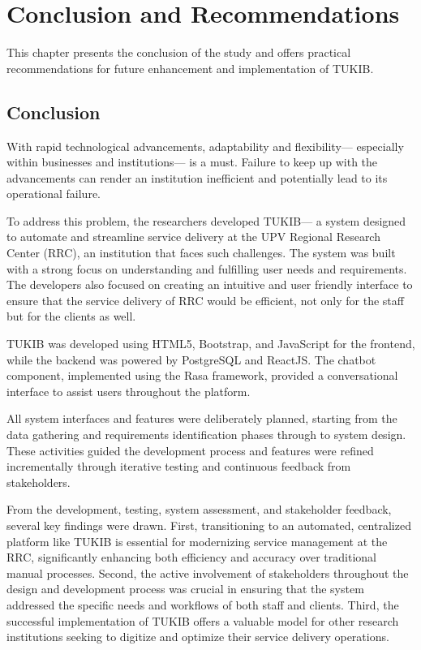 \chapter{Conclusion and Recommendations}
This chapter presents the conclusion of the study and offers practical recommendations for future enhancement and implementation of TUKIB.

\section{Conclusion}

With rapid technological advancements, adaptability and flexibility— especially within businesses and institutions— is a must. Failure to keep up with the advancements can render an institution inefficient and potentially lead to its operational failure.

To address this problem, the researchers developed TUKIB— a system designed to automate and streamline service delivery at the UPV Regional Research Center (RRC), an institution that faces such challenges. The system was built with a strong focus on understanding and fulfilling user needs and requirements. The developers also focused on creating an intuitive and user friendly interface to ensure that the service delivery of RRC would be efficient, not only for the staff but for the clients as well. 

TUKIB was developed using HTML5, Bootstrap, and JavaScript for the frontend, while the backend was powered by PostgreSQL and ReactJS. The chatbot component, implemented using the Rasa framework, provided a conversational interface to assist users throughout the platform.

All system interfaces and features were deliberately planned, starting from the data gathering and requirements identification phases through to system design. These activities guided the development process and features were refined incrementally through iterative testing and continuous feedback from stakeholders.

From the development, testing, system assessment, and stakeholder feedback, several key findings were drawn. First, transitioning to an automated, centralized platform like TUKIB is essential for modernizing service management at the RRC, significantly enhancing both efficiency and accuracy over traditional manual processes. Second, the active involvement of stakeholders throughout the design and development process was crucial in ensuring that the system addressed the specific needs and workflows of both staff and clients. Third, the successful implementation of TUKIB offers a valuable model for other research institutions seeking to digitize and optimize their service delivery operations.


